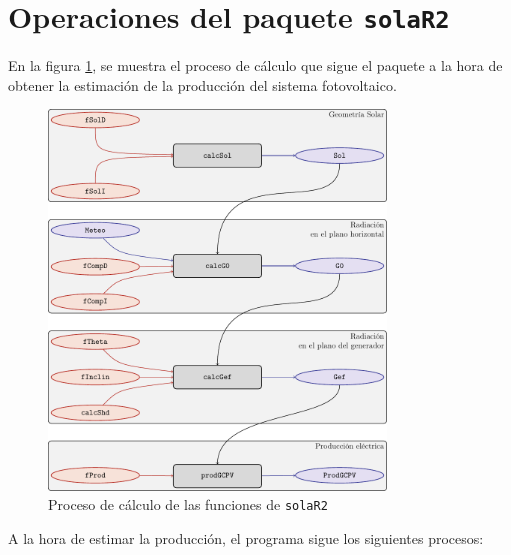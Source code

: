 \section{Operaciones del paquete \texttt{solaR2}}
\label{sec:orgd6c37a3}
\label{sec:operaciones-paquete}
En la figura \ref{fig:orgc92016e}, se muestra el proceso de cálculo que sigue el paquete a la hora de obtener la estimación de la producción del sistema fotovoltaico.
\begin{figure}[]
\centering
\includegraphics[keepaspectratio,width=0.8\textwidth,height=0.5\textheight]{figuras/procedure.pdf}
\caption{\label{fig:orgc92016e}Proceso de cálculo de las funciones de \texttt{solaR2}}
\end{figure}
A la hora de estimar la producción, el programa sigue los siguientes procesos:
